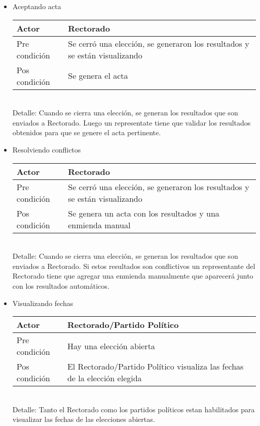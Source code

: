 \begin{itemize}
\bigskip
\item Aceptando acta
\begin{center}
\begin{tabular}{ll}
Actor & Rectorado \\
\hline
Pre condición & Se cerró una elección, se generaron los resultados y se están visualizando\\
\hline
Pos condición & Se genera el acta\\
\hline
\end{tabular}
\medskip
\\
Detalle: Cuando se cierra una elección, se generan los resultados que son enviados a Rectorado. Luego un representate tiene que validar los resultados obtenidos para que se genere el acta pertinente.
\end{center}

\bigskip
\item Resolviendo conflictos
\begin{center}
\begin{tabular}{ll}
Actor & Rectorado \\
\hline
Pre condición & Se cerró una elección, se generaron los resultados y se están visualizando\\
\hline
Pos condición & Se genera un acta con los resultados y una enmienda manual\\
\hline
\end{tabular}
\medskip
        \\
Detalle: Cuando se cierra una elección, se generan los resultados que son enviados a Rectorado. Si estos resultados son conflictivos un representante del Rectorado tiene que agregar una enmienda manualmente que aparecerá junto con los resultados automáticos.
\end{center}

\bigskip
\item Visualizando fechas
\begin{center}
\begin{tabular}{ll}
Actor & Rectorado/Partido Político \\
\hline
Pre condición & Hay una elección abierta\\
\hline
Pos condición & El Rectorado/Partido Político visualiza las fechas de la elección elegida\\
\hline
\end{tabular}
\\
\medskip
Detalle: Tanto el Rectorado como los partidos políticos estan habilitados para visualizar las fechas de las elecciones abiertas.
\end{center}


 

\end{itemize}